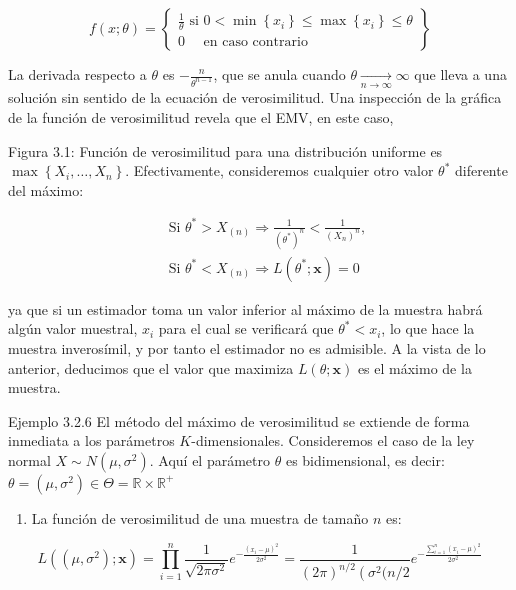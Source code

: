 \documentclass[
]{article}
\providecommand{\tightlist}{%
  \setlength{\itemsep}{0pt}\setlength{\parskip}{0pt}}
\begin{document}
\[
f(x ; \theta)=\left\{\begin{array}{c}
\frac{1}{\theta} \text { si } 0<\min \left\{x_{i}\right\} \leq \max \left\{x_{i}\right\} \leq \theta \\
0 \quad \text { en caso contrario }
\end{array}\right\}
\]

La derivada respecto a \(\theta\) es \(-\frac{n}{\theta^{n-1}}\), que se anula cuando \(\theta \underset{n \rightarrow \infty}{\longrightarrow} \infty\) que lleva a una solución sin sentido de la ecuación de verosimilitud. Una inspección de la gráfica de la función de verosimilitud revela que el EMV, en este caso,

Figura 3.1: Función de verosimilitud para una distribución uniforme
es \(\max \left\{X_{i}, \ldots, X_{n}\right\}\). Efectivamente, consideremos cualquier otro valor \(\theta^{*}\) diferente del máximo:

\[
\begin{aligned}
& \text { Si } \theta^{*}>X_{(n)} \Rightarrow \frac{1}{\left(\theta^{*}\right)^{n}}<\frac{1}{\left(X_{n}\right)^{n}}, \\
& \text { Si } \theta^{*}<X_{(n)} \Rightarrow L\left(\theta^{*} ; \mathbf{x}\right)=0
\end{aligned}
\]

ya que si un estimador toma un valor inferior al máximo de la muestra habrá algún valor muestral, \(x_{i}\) para el cual se verificará que \(\theta^{*}<x_{i}\), lo que hace la muestra inverosímil, y por tanto el estimador no es admisible.
A la vista de lo anterior, deducimos que el valor que maximiza \(L(\theta ; \mathbf{x})\) es el máximo de la muestra.

Ejemplo 3.2.6 El método del máximo de verosimilitud se extiende de forma inmediata a los parámetros \(K\)-dimensionales. Consideremos el caso de la
ley normal \(X \sim N\left(\mu, \sigma^{2}\right)\). Aquí el parámetro \(\theta\) es bidimensional, es decir: \(\theta=\left(\mu, \sigma^{2}\right) \in \Theta=\mathbb{R} \times \mathbb{R}^{+}\)

\begin{enumerate}
\def\labelenumi{\arabic{enumi}.}
\tightlist
\item
  La función de verosimilitud de una muestra de tamaño \(n\) es:
\end{enumerate}

\[
L\left(\left(\mu, \sigma^{2}\right) ; \mathbf{x}\right)=\prod_{i=1}^{n} \frac{1}{\sqrt{2 \pi \sigma^{2}}} e^{-\frac{\left(x_{i}-\mu\right)^{2}}{2 \sigma^{2}}}=\frac{1}{(2 \pi)^{n / 2}\left(\sigma^{2}(n / 2\right.} e^{-\frac{\sum_{i=1}^{n}\left(x_{i}-\mu\right)^{2}}{2 \sigma^{2}}}
\]
\end{document}
